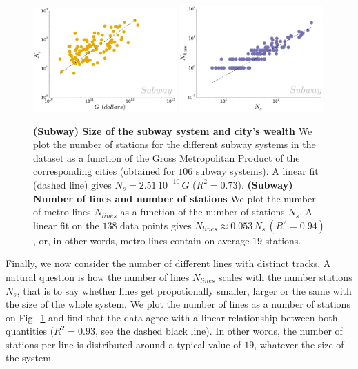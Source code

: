 \begin{figure}
\centering
    \includegraphics[width=0.49\textwidth]{gfx/chapter-networks/metro_stations_gdp.pdf}
    \includegraphics[width=0.49\textwidth]{gfx/chapter-networks/metro_lines_stations.pdf}
    \caption{{\bf (Subway) Size of the subway system and city's wealth} We plot the number of stations for the different subway systems in the dataset as a function of the Gross Metropolitan Product of the corresponding cities (obtained for $106$ subway systems). A linear fit (dashed line) gives $N_s = 2.51\, 10^{-10}\,G$ ($R^2=0.73$). {\bf (Subway) Number of lines and number of stations} We plot the number of metro lines $N_{lines}$ as a function of the number of stations $N_s$. A linear fit on the $138$ data points gives $N_{lines} \approx 0.053\,N_s\,(R^2=0.94)$, or, in other words, metro lines contain on average $19$ stations.}
    \label{fig:metro_stations_gdp}
\end{figure}

Finally, we now consider the number of different lines with distinct tracks. A
natural question is how the number of lines $N_{lines}$ scales with the number
stations $N_s$, that is to say whether lines get propotionally smaller, larger
or the same with the size of the whole system. We plot the number of lines as a
number of stations on Fig.~\ref{fig:metro_stations_gdp} and find that the data
agree with a linear relationship between both quantities ($R^2=0.93$, see the
dashed black line). In other words, the number of stations per line is
distributed around a typical value of $19$, whatever the size of the system.


